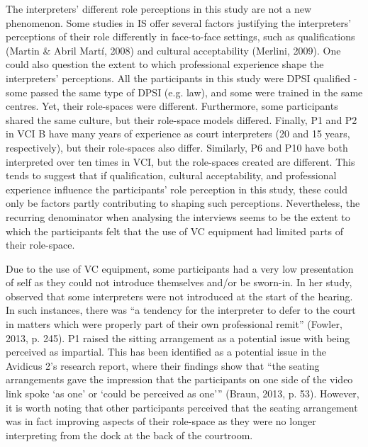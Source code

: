 \documentclass[output=paper]{langsci/langscibook}
\begin{document}
The interpreters’ different role perceptions in this study are not a new phenomenon. Some studies in IS offer several factors justifying the interpreters’ perceptions of their role differently in face-to-face settings, such as qualifications (Martin \& Abril Martí, 2008) and cultural acceptability (Merlini, 2009). One could also question the extent to which professional experience shape the interpreters’ perceptions. All the participants in this study were DPSI qualified - some passed the same type of DPSI (e.g. law), and some were trained in the same centres. Yet, their role-spaces were different. Furthermore, some participants shared the same culture, but their role-space models differed. Finally, P1 and P2 in VCI B have many years of experience as court interpreters (20 and 15 years, respectively), but their role-spaces also differ. Similarly, P6 and P10 have both interpreted over ten times in VCI, but the role-spaces created are different. This tends to suggest that if qualification, cultural acceptability, and professional experience influence the participants’ role perception in this study, these could only be factors partly contributing to shaping such perceptions. Nevertheless, the recurring denominator when analysing the interviews seems to be the extent to which the participants felt that the use of VC equipment had limited parts of their role-space. 

Due to the use of VC equipment, some participants had a very low presentation of self as they could not introduce themselves and/or be sworn-in. In her study, \citet{Fowler2013} observed that some interpreters were not introduced at the start of the hearing. In such instances, there was “a tendency for the interpreter to defer to the court in matters which were properly part of their own professional remit” (Fowler, 2013, p. 245). P1 raised the sitting arrangement as a potential issue with being perceived as impartial. This has been identified as a potential issue in the Avidicus 2’s research report, where their findings show that “the seating arrangements gave the impression that the participants on one side of the video link spoke ‘as one’ or ‘could be perceived as one’” (Braun, 2013, p. 53). However, it is worth noting that other participants perceived that the seating arrangement was in fact improving aspects of their role-space as they were no longer interpreting from the dock at the back of the courtroom.
\end{document}
